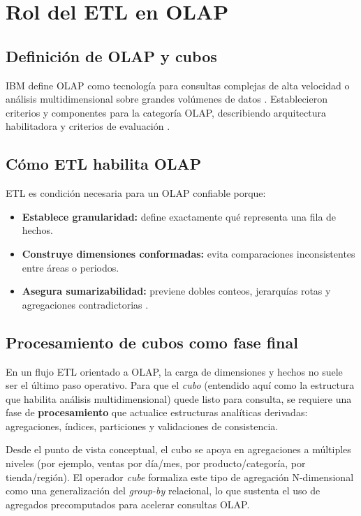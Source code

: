 \documentclass[12pt]{article}
\begin{document}
\section{Rol del ETL en OLAP}
\subsection{Definición de OLAP y cubos}
IBM define OLAP como tecnología para consultas complejas de alta velocidad o análisis multidimensional sobre grandes volúmenes de datos \cite{ibm_olap}. Establecieron criterios y componentes para la categoría OLAP, describiendo arquitectura habilitadora y criterios de evaluación \cite{codd_olap}.

\subsection{Cómo ETL habilita OLAP}
ETL es condición necesaria para un OLAP confiable porque:

\begin{itemize}[leftmargin=*]
\item \textbf{Establece granularidad:} define exactamente qué representa una fila de hechos.
\item \textbf{Construye dimensiones conformadas:} evita comparaciones inconsistentes entre áreas o periodos.
\item \textbf{Asegura sumarizabilidad:} previene dobles conteos, jerarquías rotas y agregaciones contradictorias \cite{gray_cube}.
\end{itemize}

\subsection{Procesamiento de cubos como fase final}


En un flujo ETL orientado a OLAP, la carga de dimensiones y hechos no suele ser el último paso operativo. Para que el \textit{cubo} (entendido aquí como la estructura que habilita análisis multidimensional) quede listo para consulta, se requiere una fase de \textbf{procesamiento} que actualice estructuras analíticas derivadas: agregaciones, índices, particiones y validaciones de consistencia.

Desde el punto de vista conceptual, el cubo se apoya en agregaciones a múltiples niveles (por ejemplo, ventas por día/mes, por producto/categoría, por tienda/región). El operador \textit{cube} formaliza este tipo de agregación N-dimensional como una generalización del \textit{group-by} relacional, lo que sustenta el uso de agregados precomputados para acelerar consultas OLAP. \cite{gray_cube,ibm_olap}
\end{document}
